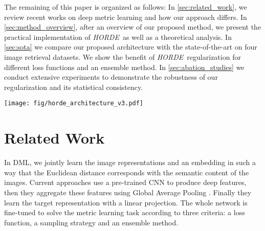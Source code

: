 \documentclass[10pt,twocolumn,letterpaper]{article}
\def\ourmethod{\textit{HORDE}}
\begin{document}
    The remaining of this paper is organized as follows:
    In \autoref{sec:related_work}, we review recent works on deep metric learning and how our approach differs.
    In \autoref{sec:method_overview}, after an overview of our proposed method, we present the practical implementation of \ourmethod \ as well as a theoretical analysis.
    In \autoref{sec:sota} we compare our proposed architecture with the state-of-the-art on four image retrieval datasets.
    We show the benefit of \ourmethod \ regularization for different loss functions and an ensemble method.
    In \autoref{sec:abation_studies} we conduct extensive experiments to demonstrate the robustness of our regularization and its statistical consistency.
 
\begin{figure*}
    \centering
    \texttt{[image: fig/horde\_architecture\_v3.pdf]}
    \caption{Global overview of our \ourmethod \ architecture. The deep convolutional neural network extracts  deep features. The standard architecture (top blue block) relies on a global average pooling and an embedding before computing the  loss. The bottom red block is our \ourmethod \ regularizer, composed by the approximation of all high-order moments ,  global average pooling and embeddings before computing the sum of each  loss.}
    \label{fig:horde_architecture}
\end{figure*}
    
\section{Related Work}\label{sec:related_work}
    In DML, we jointly learn the image representations and an embedding in such a way that the Euclidean distance corresponds with the semantic content of the images.
    Current approaches use a pre-trained CNN to produce deep features, then they aggregate these features using Global Average Pooling \cite{Zhou_2016_CVPR}.
    Finally they learn the target representation with a linear projection.
The whole network is fine-tuned to solve the metric learning task according to three criteria: a loss function, a sampling strategy and an ensemble method.
    
\end{document}
